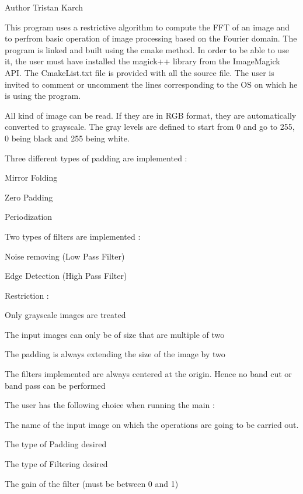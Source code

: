 \begin{DoxyAuthor}{Author}
Tristan Karch
\end{DoxyAuthor}
This program uses a restrictive algorithm to compute the F\+FT of an image and to perfrom basic operation of image processing based on the Fourier domain. The program is linked and built using the cmake method. In order to be able to use it, the user must have installed the magick++ library from the Image\+Magick A\+PI. The Cmake\+List.\+txt file is provided with all the source file. The user is invited to comment or uncomment the lines corresponding to the OS on which he is using the program.

All kind of image can be read. If they are in R\+GB format, they are automatically converted to grayscale. The gray levels are defined to start from 0 and go to 255, 0 being black and 255 being white.

Three different types of padding are implemented \+:
\begin{DoxyItemize}
\item Mirror Folding
\item Zero Padding
\item Periodization
\end{DoxyItemize}

Two types of filters are implemented \+:
\begin{DoxyItemize}
\item Noise removing (Low Pass Filter)
\item Edge Detection (High Pass Filter)
\end{DoxyItemize}

Restriction \+:
\begin{DoxyItemize}
\item Only grayscale images are treated
\item The input images can only be of size that are multiple of two
\item The padding is always extending the size of the image by two
\item The filters implemented are always centered at the origin. Hence no band cut or band pass can be performed
\end{DoxyItemize}

The user has the following choice when running the main \+:
\begin{DoxyItemize}
\item The name of the input image on which the operations are going to be carried out.
\item The type of Padding desired
\item The type of Filtering desired
\item The gain of the filter (must be between 0 and 1)
\end{DoxyItemize}

